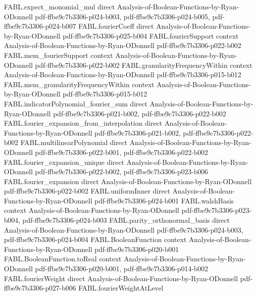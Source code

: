 \begin{theorem}
\proofstep
  {FABL.expect_monomial_mul}
  {direct}
  {Analysis-of-Boolean-Functions-by-Ryan-ODonnell}
  {pdf-ffbe9c7b3306-p024-b003,
    pdf-ffbe9c7b3306-p024-b005,
    pdf-ffbe9c7b3306-p024-b007}
\proofstep
  {FABL.fourierCoeff}
  {direct}
  {Analysis-of-Boolean-Functions-by-Ryan-ODonnell}
  {pdf-ffbe9c7b3306-p025-b004}
\proofstep
  {FABL.fourierSupport}
  {context}
  {Analysis-of-Boolean-Functions-by-Ryan-ODonnell}
  {pdf-ffbe9c7b3306-p022-b002}
\proofstep
  {FABL.mem_fourierSupport}
  {context}
  {Analysis-of-Boolean-Functions-by-Ryan-ODonnell}
  {pdf-ffbe9c7b3306-p022-b002}
\proofstep
  {FABL.granularityFrequencyWithin}
  {context}
  {Analysis-of-Boolean-Functions-by-Ryan-ODonnell}
  {pdf-ffbe9c7b3306-p015-b012}
\proofstep
  {FABL.mem_granularityFrequencyWithin}
  {context}
  {Analysis-of-Boolean-Functions-by-Ryan-ODonnell}
  {pdf-ffbe9c7b3306-p015-b012}
\proofstep
  {FABL.indicatorPolynomial_fourier_sum}
  {direct}
  {Analysis-of-Boolean-Functions-by-Ryan-ODonnell}
  {pdf-ffbe9c7b3306-p021-b002,
    pdf-ffbe9c7b3306-p022-b002}
\proofstep
  {FABL.fourier_expansion_from_interpolation}
  {direct}
  {Analysis-of-Boolean-Functions-by-Ryan-ODonnell}
  {pdf-ffbe9c7b3306-p021-b002,
    pdf-ffbe9c7b3306-p022-b002}
\proofstep
  {FABL.multilinearPolynomial}
  {direct}
  {Analysis-of-Boolean-Functions-by-Ryan-ODonnell}
  {pdf-ffbe9c7b3306-p022-b001,
    pdf-ffbe9c7b3306-p022-b002}
\proofstep
  {FABL.fourier_expansion_unique}
  {direct}
  {Analysis-of-Boolean-Functions-by-Ryan-ODonnell}
  {pdf-ffbe9c7b3306-p022-b002,
    pdf-ffbe9c7b3306-p023-b006}
\proofstep
  {FABL.fourier_expansion}
  {direct}
  {Analysis-of-Boolean-Functions-by-Ryan-ODonnell}
  {pdf-ffbe9c7b3306-p022-b002}
\proofstep
  {FABL.uniformInner}
  {direct}
  {Analysis-of-Boolean-Functions-by-Ryan-ODonnell}
  {pdf-ffbe9c7b3306-p024-b001}
\proofstep
  {FABL.walshBasis}
  {context}
  {Analysis-of-Boolean-Functions-by-Ryan-ODonnell}
  {pdf-ffbe9c7b3306-p023-b004,
    pdf-ffbe9c7b3306-p024-b003}
\proofstep
  {FABL.parity_orthonormal_basis}
  {direct}
  {Analysis-of-Boolean-Functions-by-Ryan-ODonnell}
  {pdf-ffbe9c7b3306-p024-b003,
    pdf-ffbe9c7b3306-p024-b004}
\proofstep
  {FABL.BooleanFunction}
  {context}
  {Analysis-of-Boolean-Functions-by-Ryan-ODonnell}
  {pdf-ffbe9c7b3306-p020-b001}
\proofstep
  {FABL.BooleanFunction.toReal}
  {context}
  {Analysis-of-Boolean-Functions-by-Ryan-ODonnell}
  {pdf-ffbe9c7b3306-p020-b001,
    pdf-ffbe9c7b3306-p014-b002}
\proofstep
  {FABL.fourierWeight}
  {direct}
  {Analysis-of-Boolean-Functions-by-Ryan-ODonnell}
  {pdf-ffbe9c7b3306-p027-b006}
\proofstep
  {FABL.fourierWeightAtLevel}

\end{theorem}
